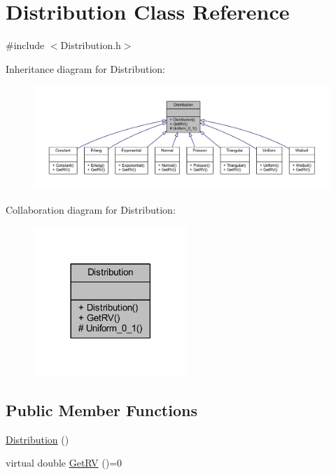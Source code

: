 \hypertarget{class_distribution}{}\section{Distribution Class Reference}
\label{class_distribution}


{\ttfamily \#include $<$Distribution.\+h$>$}



Inheritance diagram for Distribution\+:
\nopagebreak
\begin{figure}[H]
\begin{center}
\leavevmode
\includegraphics[width=350pt]{class_distribution__inherit__graph}
\end{center}
\end{figure}


Collaboration diagram for Distribution\+:
\nopagebreak
\begin{figure}[H]
\begin{center}
\leavevmode
\includegraphics[width=165pt]{class_distribution__coll__graph}
\end{center}
\end{figure}
\subsection*{Public Member Functions}
\begin{DoxyCompactItemize}
\item 
\hyperlink{class_distribution_ada837c9a1da728290d6bbea0bb6b266f}{Distribution} ()
\item 
virtual double \hyperlink{class_distribution_a63b433850d7b47d84eb69448f7916719}{Get\+RV} ()=0
\end{DoxyCompactItemize}
